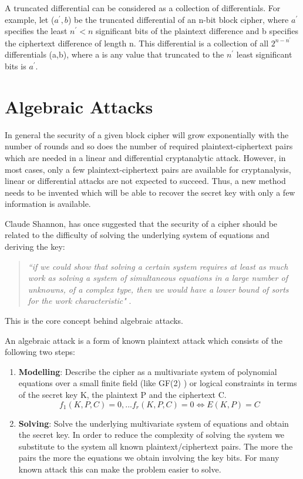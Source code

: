A truncated differential can be considered as a collection of differentials. For example, let ($a^{'},b$) be the truncated differential of an  n-bit block cipher, where $a^{'}$ specifies the least $n^{'} < n$ significant bits of the plaintext difference and b specifies the ciphertext difference of length n. This differential is a collection of all $2^{n-n^{'}}$ differentials (a,b), where a is any value that truncated to the $n^{'}$ least significant bits is $a^{'}$. 

\section{Algebraic Attacks} \label{sec:AA}

In general the security of a given block cipher will grow exponentially with the number of rounds and so does the number of required plaintext-ciphertext pairs which are needed in a linear and differential cryptanalytic attack. However, in most cases, only a few plaintext-ciphertext pairs are available for cryptanalysis, linear or differential attacks are not expected to succeed. Thus, a new method needs to be invented which will be able to recover the secret key with only a few information is available.

Claude Shannon, has once suggested that the security of a cipher should be related to the difficulty of solving the underlying system of equations and deriving the key: 


\begin{quotation}
	\textit{``if we could show that solving a certain system requires at least as much work as solving a system of simultaneous equations in a large number of unknowns, of a complex type, then we would have a lower bound of sorts for the work characteristic"} \cite{Shannon}. 
\end{quotation}
This is the core concept behind algebraic attacks. 

An algebraic attack is a form of known plaintext attack which consists of the following two steps:

\begin{enumerate}
	\item \textbf{Modelling}: Describe the cipher as a multivariate system of polynomial equations over a small finite field (like GF(2) ) or logical constraints in terms of the secret key K, the plaintext P and the ciphertext C. $$ {f_{1}(K,P,C)=0,...f_{r}(K,P,C)=0 \Longleftrightarrow E(K,P) = C}$$
	
	\item \textbf{Solving}: Solve the underlying multivariate system of equations and obtain the secret key. In order to reduce the complexity of solving the system we substitute to the system all known plaintext/ciphertext pairs. The more the pairs the more
	the equations we obtain involving the key bits. For many known attack this can make the problem easier to solve.
\end{enumerate}

